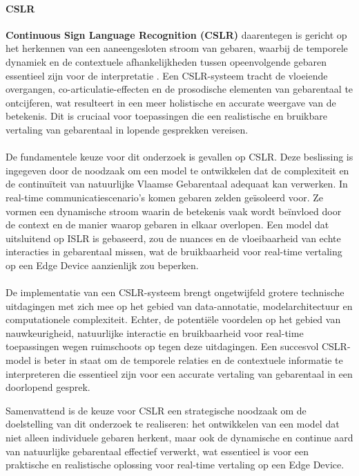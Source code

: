 \paragraph{CSLR}
\textbf{Continuous Sign Language Recognition (CSLR)} daarentegen is gericht op het herkennen van een aaneengesloten stroom van gebaren, waarbij de temporele dynamiek en de contextuele afhankelijkheden tussen opeenvolgende gebaren essentieel zijn voor de interpretatie \citep{Sinha_et_al_2021}. 
Een CSLR-systeem tracht de vloeiende overgangen, co-articulatie-effecten en de prosodische elementen van gebarentaal te ontcijferen, wat resulteert in een meer holistische en accurate weergave van de betekenis. 
Dit is cruciaal voor toepassingen die een realistische en bruikbare vertaling van gebarentaal in lopende gesprekken vereisen.
\\
\\
De fundamentele keuze voor dit onderzoek is gevallen op CSLR. 
Deze beslissing is ingegeven door de noodzaak om een model te ontwikkelen dat de complexiteit en de continuïteit van natuurlijke Vlaamse Gebarentaal adequaat kan verwerken. 
In real-time communicatiescenario's komen gebaren zelden geïsoleerd voor. 
Ze vormen een dynamische stroom waarin de betekenis vaak wordt beïnvloed door de context en de manier waarop gebaren in elkaar overlopen. 
Een model dat uitsluitend op ISLR is gebaseerd, zou de nuances en de vloeibaarheid van echte interacties in gebarentaal missen, wat de bruikbaarheid voor real-time vertaling op een Edge Device aanzienlijk zou beperken.
\\
\\
De implementatie van een CSLR-systeem brengt ongetwijfeld grotere technische uitdagingen met zich mee op het gebied van data-annotatie, modelarchitectuur en computationele complexiteit. 
Echter, de potentiële voordelen op het gebied van nauwkeurigheid, natuurlijke interactie en bruikbaarheid voor real-time toepassingen wegen ruimschoots op tegen deze uitdagingen. 
Een succesvol CSLR-model is beter in staat om de temporele relaties en de contextuele informatie te interpreteren die essentieel zijn voor een accurate vertaling van gebarentaal in een doorlopend gesprek.

Samenvattend is de keuze voor CSLR een strategische noodzaak om de doelstelling van dit onderzoek te realiseren: het ontwikkelen van een model dat niet alleen individuele gebaren herkent, maar ook de dynamische en continue aard van natuurlijke gebarentaal effectief verwerkt, wat essentieel is voor een praktische en realistische oplossing voor real-time vertaling op een Edge Device.
